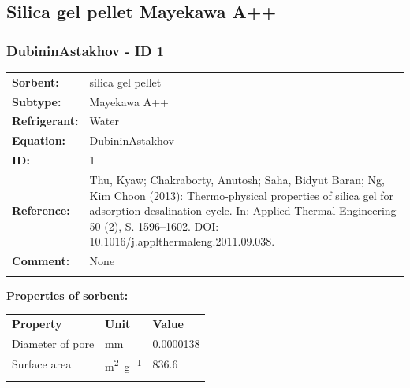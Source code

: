 \subsection{Silica gel pellet Mayekawa A++}
%
\subsubsection{DubininAstakhov - ID 1}
%
\begin{tabular}[l]{|lp{11.5cm}|}
\hline
\addlinespace

\textbf{Sorbent:} & silica gel pellet \\
\textbf{Subtype:} & Mayekawa A++ \\
\textbf{Refrigerant:} & Water \\
\textbf{Equation:} & DubininAstakhov \\
\textbf{ID:} & 1 \\
\textbf{Reference:} & Thu, Kyaw; Chakraborty, Anutosh; Saha, Bidyut Baran; Ng, Kim Choon (2013): Thermo-physical properties of silica gel for adsorption desalination cycle. In: Applied Thermal Engineering 50 (2), S. 1596–1602. DOI: 10.1016/j.applthermaleng.2011.09.038. \\
\textbf{Comment:} & None \\

\addlinespace
\hline
\end{tabular}
\newline

\textbf{Properties of sorbent:}
\newline
%
\begin{longtable}[l]{lll}
\toprule
\addlinespace
\textbf{Property} & \textbf{Unit} & \textbf{Value} \\
\addlinespace
\midrule
\endhead
\bottomrule
\endfoot
\bottomrule
\endlastfoot
\addlinespace

Diameter of pore & \si{\milli\meter} & 0.0000138\\
Surface area & \si{\square\meter\per\gram} & 836.6\\

\addlinespace\end{longtable}

